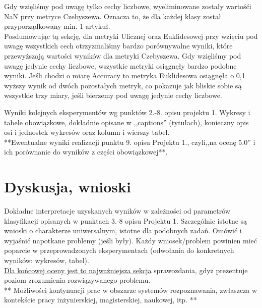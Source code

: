 \documentclass{classrep}
\begin{document}
Gdy wzięliśmy pod uwagę tylko cechy liczbowe, wyeliminowane zostały wartośći NaN przy metryce Czebyszewa. Oznacza to, że dla każdej klasy został przyporządkowany min. 1 artykuł.
\\
Posdumowując tą sekcję, dla metryki Ulicznej oraz Euklidesowej przy wzięciu pod uwagę wszystkich cech otrzyzmaliśmy bardzo porównywalne wyniki, które przewyższają wartości wyników dla metryki Czebyszewa. Gdy wzięliśmy pod uwagę jedynie cechy liczbowe, wszystkie metryki osiągnęły bardzo podobne wyniki. Jeśli chodzi o miarę Accuracy to metryka Euklidesowa osiągnęła o 0,1 wyższy wynik od dwóch pozostałych metryk, co pokazuje jak bliskie sobie są wszystkie trzy miary, jeśli bierzemy pod uwagę jedynie cechy liczbowe.

Wyniki kolejnych eksperymentów wg punktów 2.-8. opisu projektu 1.  Wykresy i tabele
obowiązkowe, dokładnie opisane w ,,captions'' (tytułach), konieczny opis osi i
jednostek wykresów oraz kolumn i wierszy tabel.\\ 

{**Ewentualne wyniki realizacji punktu 9. opisu Projektu 1., czyli,,na ocenę 5.0'' i ich porównanie do wyników z
części obowiązkowej**.}\\


\clearpage
\section{Dyskusja, wnioski}
Dokładne interpretacje uzyskanych wyników w zależności od parametrów klasyfikacji
opisanych w punktach 3.-8 opisu Projektu 1. 
Szczególnie istotne są wnioski o charakterze uniwersalnym, istotne dla podobnych zadań. 
Omówić i wyjaśnić napotkane problemy (jeśli były). Każdy wniosek/problem powinien mieć poparcie
w przeprowadzonych eksperymentach (odwołania do konkretnych wyników: wykresów,
tabel). \\
\underline{Dla końcowej oceny jest to najważniejsza sekcja} sprawozdania, gdyż prezentuje poziom
zrozumienia rozwiązywanego problemu.\\

** Możliwości kontynuacji prac w obszarze systemów rozpoznawania, zwłaszcza w kontekście pracy inżynierskiej,
magisterskiej, naukowej, itp. **\\

\end{document}
